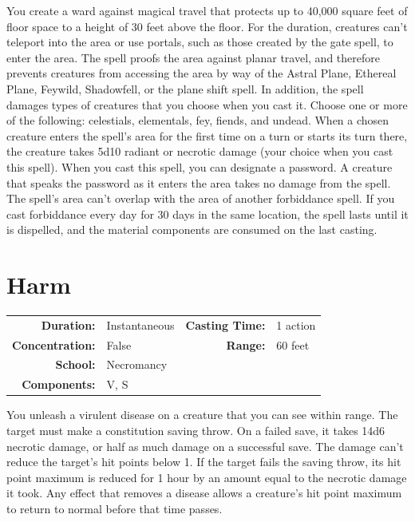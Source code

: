 \documentclass[12pt,showtrims]{memoir}
\begin{document}
\vspace{1\baselineskip}\noindent You create a ward against magical travel that protects up to 40,000 square feet of floor space to a height of 30 feet above the floor. For the duration, creatures can't teleport into the area or use portals, such as those created by the gate spell, to enter the area. The spell proofs the area against planar travel, and therefore prevents creatures from accessing the area by way of the Astral Plane, Ethereal Plane, Feywild, Shadowfell, or the plane shift spell. In addition, the spell damages types of creatures that you choose when you cast it. Choose one or more of the following: celestials, elementals, fey, fiends, and undead. When a chosen creature enters the spell's area for the first time on a turn or starts its turn there, the creature takes 5d10 radiant or necrotic damage (your choice when you cast this spell). When you cast this spell, you can designate a password. A creature that speaks the password as it enters the area takes no damage from the spell. The spell's area can't overlap with the area of another forbiddance spell. If you cast forbiddance every day for 30 days in the same location, the spell lasts until it is dispelled, and the material components are consumed on the last casting.

\newpage
\section*{Harm}

{
\small\centering\vspace{-6pt}
\begin{tabular}{rlrl}
\toprule

\textbf{Duration:} & Instantaneous &
\textbf{Casting Time:} & 1 action \\
\textbf{Concentration:} & False &
\textbf{Range:} & 60 feet \\
\textbf{School:} & Necromancy \\
\textbf{Components:} & \multicolumn{3}{p{0.7\textwidth}}{V, S}\\

\bottomrule
\end{tabular}
}

\vspace{1\baselineskip}\noindent You unleash a virulent disease on a creature that you can see within range. The target must make a constitution saving throw. On a failed save, it takes 14d6 necrotic damage, or half as much damage on a successful save. The damage can't reduce the target's hit points below 1. If the target fails the saving throw, its hit point maximum is reduced for 1 hour by an amount equal to the necrotic damage it took. Any effect that removes a disease allows a creature's hit point maximum to return to normal before that time passes.
\end{document}
